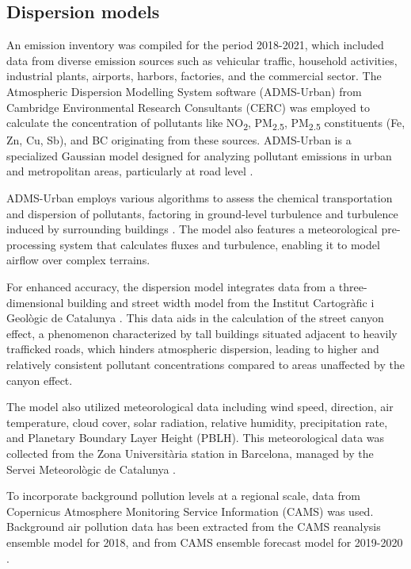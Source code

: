\documentclass{article}
\begin{document}
\subsection{Dispersion models}

An emission inventory was compiled for the period 2018-2021, which included data from diverse emission sources such as vehicular traffic, household activities, industrial plants, airports, harbors, factories, and the commercial sector. The Atmospheric Dispersion Modelling System software (ADMS-Urban) from Cambridge Environmental Research Consultants (CERC) was employed to calculate the concentration of pollutants like NO\textsubscript{2}, PM\textsubscript{2.5}, PM\textsubscript{2.5} constituents (Fe, Zn, Cu, Sb), and BC originating from these sources. ADMS-Urban is a specialized Gaussian model designed for analyzing pollutant emissions in urban and metropolitan areas, particularly at road level \cite{mchugh1997adms}.

ADMS-Urban employs various algorithms to assess the chemical transportation and dispersion of pollutants, factoring in ground-level turbulence and turbulence induced by surrounding buildings \cite{stocker2012adms}. The model also features a meteorological pre-processing system that calculates fluxes and turbulence, enabling it to model airflow over complex terrains.

For enhanced accuracy, the dispersion model integrates data from a three-dimensional building and street width model from the Institut Cartogràfic i Geològic de Catalunya \cite{stoter2016state, 3Dcity}. This data aids in the calculation of the street canyon effect, a phenomenon characterized by tall buildings situated adjacent to heavily trafficked roads, which hinders atmospheric dispersion, leading to higher and relatively consistent pollutant concentrations compared to areas unaffected by the canyon effect.

The model also utilized meteorological data including wind speed, direction, air temperature, cloud cover, solar radiation, relative humidity, precipitation rate, and Planetary Boundary Layer Height (PBLH). This meteorological data was collected from the Zona Universitària station in Barcelona, managed by the Servei Meteorològic de Catalunya \cite{xema2013}.

To incorporate background pollution levels at a regional scale, data from Copernicus Atmosphere Monitoring Service Information (CAMS) was used. Background air pollution data has been extracted from the CAMS reanalysis ensemble model for 2018, and from CAMS ensemble forecast model for 2019-2020 \cite{cams2020, franceinstitut}. 
\end{document}
